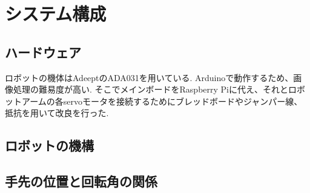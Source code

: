 \chapter{システム構成}
  \label{chap:system}
  \section{ハードウェア}
  	\label{chap:hardware}
 	ロボットの機体はAdeeptのADA031を用いている. Arduinoで動作するため、画像処理の難易度が高い. そこでメインボードをRaspberry Piに代え、それとロボットアームの各servoモータを接続するためにブレッドボードやジャンパー線、抵抗を用いて改良を行った.
  \section{ロボットの機構}
  	\label{chap:mechanism}
	
  
  \section{手先の位置と回転角の関係}
  	\label{chap:kinetic}
